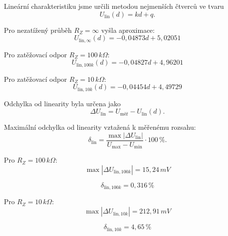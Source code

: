 \documentclass[a4paper,12pt]{article}
\begin{document}
Lineární charakteristiku jsme určili metodou nejmenších čtverců ve tvaru
$$
U_{\mathrm{lin}}(d) = k d + q.
$$

Pro nezatížený průběh $R_Z=\infty$ vyšla aproximace:
$$
U_{\mathrm{lin},\infty}(d) = -0{,}04873d + 5{,}02051
$$

Pro zatěžovací odpor $R_Z=100\,k\Omega$:
$$
U_{\mathrm{lin},100k}(d) = -0{,}04827d + 4{,}96201
$$

Pro zatěžovací odpor $R_Z=10\,k\Omega$:
$$
U_{\mathrm{lin},10k}(d) = -0{,}04454d + 4{,}49729
$$

Odchylka od linearity byla určena jako
$$
\Delta U_{\mathrm{lin}} = U_{\mathrm{měř}} - U_{\mathrm{lin}}(d).
$$

Maximální odchylka od linearity vztažená k měřenému rozsahu:
$$
\delta_{\mathrm{lin}} =
\frac{\max|\Delta U_{\mathrm{lin}}|}{U_{\max}-U_{\min}}\cdot 100\,\%.
$$

Pro $R_Z=100\,k\Omega$:
$$
\max|\Delta U_{\mathrm{lin},100k}| = 15{,}24\,mV
$$

$$
\delta_{\mathrm{lin},100k} = 0{,}316\,\%
$$

Pro $R_Z=10\,k\Omega$:
$$
\max|\Delta U_{\mathrm{lin},10k}| = 212{,}91\,mV
$$

$$
\delta_{\mathrm{lin},10k} = 4{,}65\,\%
$$
\end{document}
